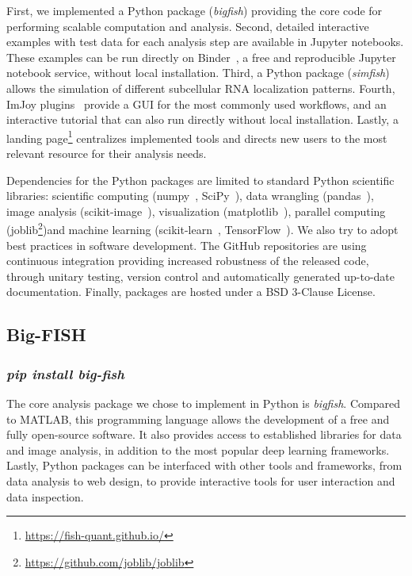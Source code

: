 First, we implemented a Python package (\emph{bigfish}) providing the core code for performing scalable computation and analysis.
Second, detailed interactive examples with test data for each analysis step are available in Jupyter notebooks.
These examples can be run directly on Binder~\cite{Jupyter2018Binder2}, a free and reproducible Jupyter notebook service, without local installation.
Third, a Python package (\emph{simfish}) allows the simulation of different subcellular \ac{RNA} localization patterns.
Fourth, ImJoy plugins~\cite{ouyang_imjoy_2019} provide a \ac{GUI} for the most commonly used workflows, and an interactive tutorial that can also run directly without local installation.
Lastly, a landing page\footnote{\url{https://fish-quant.github.io/}} centralizes implemented tools and directs new users to the most relevant resource for their analysis needs.

Dependencies for the Python packages are limited to standard Python scientific libraries: scientific computing (numpy~\cite{2020NumPy}, SciPy~\cite{2020SciPy}), data wrangling (pandas~\cite{mckinney_pandas_2010}), image analysis (scikit-image~\cite{walt_scikit-image_2014}), visualization (matplotlib~\cite{hunter_matplotlib_2007}), parallel computing (joblib\footnote{\url{https://github.com/joblib/joblib}})and machine learning (scikit-learn~\cite{pedregosa11a_scikitlearn}, TensorFlow~\cite{tensorflow_2015}).
We also try to adopt best practices in software development.
The GitHub repositories are using continuous integration providing increased robustness of the released code, through unitary testing, version control and automatically generated up-to-date documentation.
Finally, packages are hosted under a BSD 3-Clause License.

\subsection{Big-FISH}
\label{subsec:bigfish}

\subsubsection{\emph{pip install big-fish}}

The core analysis package we chose to implement in Python is \emph{bigfish}.
Compared to MATLAB, this programming language allows the development of a free and fully open-source software.
It also provides access to established libraries for data and image analysis, in addition to the most popular deep learning frameworks.
Lastly, Python packages can be interfaced with other tools and frameworks, from data analysis to web design, to provide interactive tools for user interaction and data inspection.

